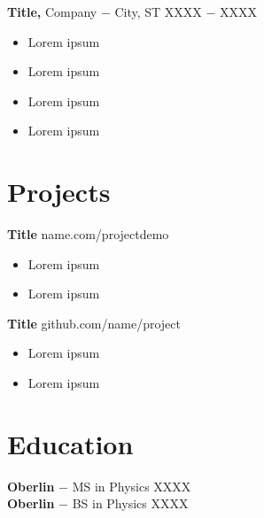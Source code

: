 \documentclass[11pt,letterpaper]{article}
\begin{document}
\textbf{Title,} Company $-$ City, ST \hfill XXXX $-$ XXXX \\
\begin{itemize}[itemsep=-2pt,leftmargin=12pt \vspace{-10pt}]
  \item Lorem ipsum
  \item Lorem ipsum
  \item Lorem ipsum
  \item Lorem ipsum
\end{itemize}

\section{Projects}
\textbf{Title} \hfill name.com/projectdemo \\
\begin{itemize}[itemsep=-2pt,leftmargin=12pt \vspace{-10pt}]
  \item Lorem ipsum
  \item Lorem ipsum
\end{itemize}

\textbf{Title} \hfill github.com/name/project \\
\begin{itemize}[itemsep=-2pt,leftmargin=12pt \vspace{-10pt}]
  \item Lorem ipsum
  \item Lorem ipsum
\end{itemize}

\section{Education}
\textbf{Oberlin} $-$ MS in Physics \hfill XXXX \\
\textbf{Oberlin} $-$ BS in Physics \hfill XXXX
\end{document}
